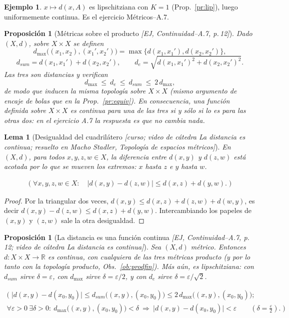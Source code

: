 \documentclass[11pt,a4paper]{article}
\newcommand{\lgc}[1]{\par\vspace{-3pt}\begin{gather*}\big(\;#1\;\big)\end{gather*}\vspace{-6pt}}
\theoremstyle{definition}
\newtheorem{ejemplo}[definicion]{Ejemplo}
\theoremstyle{plain}
\newtheorem{proposicion}[definicion]{Proposición}
\newtheorem{lema}[definicion]{Lema}
\newcommand{\fnt}[1]{{\normalfont\small\itshape\color{gray!150!black}[#1]}}
\newcommand{\R}{\mathbb{R}}
\begin{document}
\begin{ejemplo}
$x\mapsto d(x,A)$ es lipschitziana con $K=1$ (Prop.~\ref{pr:lip}), luego uniformemente continua. Es el ejercicio Métricos--A.7.
\end{ejemplo}

\begin{proposicion}[Métricas sobre el producto \fnt{EJ, Continuidad--A.7, p.\,12}]
Dado $(X,d)$, sobre $X\times X$ se definen
\[
d_{\max}\big((x_1,x_2),(x_1',x_2')\big)=\max\{d(x_1,x_1'),d(x_2,x_2')\},
\]
\[
d_{sum}=d(x_1,x_1')+d(x_2,x_2'),\qquad
d_{e}=\sqrt{d(x_1,x_1')^2+d(x_2,x_2')^2}.
\]
Las tres son distancias y verifican
\[
d_{\max}\ \le\ d_e\ \le\ d_{sum}\ \le\ 2\,d_{\max},
\]
de modo que \emph{inducen la misma topología} sobre $X\times X$ (mismo argumento de encaje de bolas que en la Prop.~\ref{pr:equiv}). En consecuencia, una función definida sobre $X\times X$ es continua para una de las tres si y sólo si lo es para las otras dos: en el ejercicio A.7 la respuesta es que \emph{no cambia nada}.
\end{proposicion}

\begin{lema}[Desigualdad del cuadrilátero \fnt{curso; video de cátedra \emph{La distancia es continua}; resuelto en Macho Stadler, \emph{Topología de espacios métricos}}]\label{le:cuadri}
En $(X,d)$, para todos $x,y,z,w\in X$, la diferencia entre $d(x,y)$ y $d(z,w)$ está acotada por lo que se mueven los extremos: $x$ hasta $z$ e $y$ hasta $w$.
\lgc{\forall x,y,z,w\in X:\quad \big|d(x,y)-d(z,w)\big|\le d(x,z)+d(y,w).}
\end{lema}

\begin{proof}
Por la triangular dos veces, $d(x,y)\le d(x,z)+d(z,w)+d(w,y)$, es decir $d(x,y)-d(z,w)\le d(x,z)+d(y,w)$. Intercambiando los papeles de $(x,y)$ y $(z,w)$ sale la otra desigualdad.
\end{proof}

\begin{proposicion}[La distancia es una función continua \fnt{EJ, Continuidad--A.7, p.\,12; video de cátedra \emph{La distancia es continua}}]\label{pr:dcont}
Sea $(X,d)$ métrico. Entonces $d:X\times X\to\R$ es continua, con cualquiera de las tres métricas producto (y por lo tanto con la topología producto, Obs.~\ref{ob:prodfin}). Más aún, es lipschitziana: con $d_{sum}$ sirve $\delta=\varepsilon$, con $d_{\max}$ sirve $\delta=\varepsilon/2$, y con $d_e$ sirve $\delta=\varepsilon/\sqrt2$.
\lgc{\big|d(x,y)-d(x_0,y_0)\big|\le d_{sum}\big((x,y),(x_0,y_0)\big)\le 2\,d_{\max}\big((x,y),(x_0,y_0)\big);\\
\forall\varepsilon>0\ \exists\delta>0:\ d_{\max}\big((x,y),(x_0,y_0)\big)<\delta\ \Rightarrow\ \big|d(x,y)-d(x_0,y_0)\big|<\varepsilon\qquad(\delta=\tfrac\varepsilon2).}
\end{proposicion}
\end{document}
